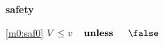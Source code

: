 \textbf{safety}
\begin{block}
\item[ \eqref{m0:saf0} ]{$V \le v \textbf{\quad unless \quad} \false$} %
\end{block}
